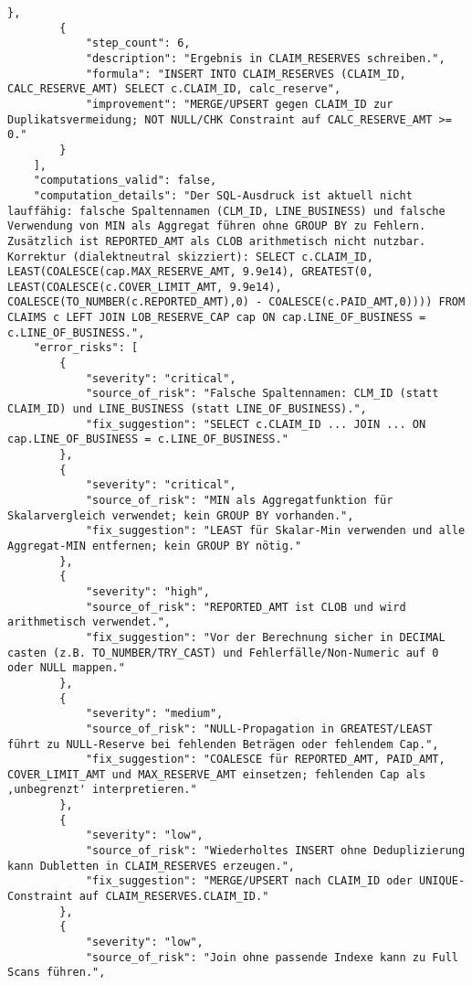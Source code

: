 \begin{lstlisting}[caption={Ausgabe: GPT-5 Anwendungsfall 10 Hauptdurchlauf},label={gpt_case10_prompt1}]
        },
        {
            "step_count": 6,
            "description": "Ergebnis in CLAIM_RESERVES schreiben.",
            "formula": "INSERT INTO CLAIM_RESERVES (CLAIM_ID, CALC_RESERVE_AMT) SELECT c.CLAIM_ID, calc_reserve",
            "improvement": "MERGE/UPSERT gegen CLAIM_ID zur Duplikatsvermeidung; NOT NULL/CHK Constraint auf CALC_RESERVE_AMT >= 0."
        }
    ],
    "computations_valid": false,
    "computation_details": "Der SQL-Ausdruck ist aktuell nicht lauffähig: falsche Spaltennamen (CLM_ID, LINE_BUSINESS) und falsche Verwendung von MIN als Aggregat führen ohne GROUP BY zu Fehlern. Zusätzlich ist REPORTED_AMT als CLOB arithmetisch nicht nutzbar. Korrektur (dialektneutral skizziert): SELECT c.CLAIM_ID, LEAST(COALESCE(cap.MAX_RESERVE_AMT, 9.9e14), GREATEST(0, LEAST(COALESCE(c.COVER_LIMIT_AMT, 9.9e14), COALESCE(TO_NUMBER(c.REPORTED_AMT),0) - COALESCE(c.PAID_AMT,0)))) FROM CLAIMS c LEFT JOIN LOB_RESERVE_CAP cap ON cap.LINE_OF_BUSINESS = c.LINE_OF_BUSINESS.",
    "error_risks": [
        {
            "severity": "critical",
            "source_of_risk": "Falsche Spaltennamen: CLM_ID (statt CLAIM_ID) und LINE_BUSINESS (statt LINE_OF_BUSINESS).",
            "fix_suggestion": "SELECT c.CLAIM_ID ... JOIN ... ON cap.LINE_OF_BUSINESS = c.LINE_OF_BUSINESS."
        },
        {
            "severity": "critical",
            "source_of_risk": "MIN als Aggregatfunktion für Skalarvergleich verwendet; kein GROUP BY vorhanden.",
            "fix_suggestion": "LEAST für Skalar-Min verwenden und alle Aggregat-MIN entfernen; kein GROUP BY nötig."
        },
        {
            "severity": "high",
            "source_of_risk": "REPORTED_AMT ist CLOB und wird arithmetisch verwendet.",
            "fix_suggestion": "Vor der Berechnung sicher in DECIMAL casten (z.B. TO_NUMBER/TRY_CAST) und Fehlerfälle/Non-Numeric auf 0 oder NULL mappen."
        },
        {
            "severity": "medium",
            "source_of_risk": "NULL-Propagation in GREATEST/LEAST führt zu NULL-Reserve bei fehlenden Beträgen oder fehlendem Cap.",
            "fix_suggestion": "COALESCE für REPORTED_AMT, PAID_AMT, COVER_LIMIT_AMT und MAX_RESERVE_AMT einsetzen; fehlenden Cap als ,unbegrenzt' interpretieren."
        },
        {
            "severity": "low",
            "source_of_risk": "Wiederholtes INSERT ohne Deduplizierung kann Dubletten in CLAIM_RESERVES erzeugen.",
            "fix_suggestion": "MERGE/UPSERT nach CLAIM_ID oder UNIQUE-Constraint auf CLAIM_RESERVES.CLAIM_ID."
        },
        {
            "severity": "low",
            "source_of_risk": "Join ohne passende Indexe kann zu Full Scans führen.",

\end{lstlisting}
